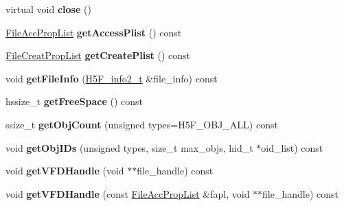 \begin{DoxyCompactItemize}
\item 
\mbox{\label{class_h5_1_1_h5_file_a937dc0b3dd01709ea65b6ff816f96757}} 
virtual void {\bfseries close} ()
\item 
\mbox{\label{class_h5_1_1_h5_file_a99f69dbd676df2186493a3090a5275db}} 
\hyperlink{class_h5_1_1_file_acc_prop_list}{File\+Acc\+Prop\+List} {\bfseries get\+Access\+Plist} () const
\item 
\mbox{\label{class_h5_1_1_h5_file_a8270a0bd23800aa05d3d12951ee40e64}} 
\hyperlink{class_h5_1_1_file_creat_prop_list}{File\+Creat\+Prop\+List} {\bfseries get\+Create\+Plist} () const
\item 
\mbox{\label{class_h5_1_1_h5_file_a7d1aa654f620e47e0283cd087f850594}} 
void {\bfseries get\+File\+Info} (\hyperlink{struct_h5_f__info2__t}{H5\+F\+\_\+info2\+\_\+t} \&file\+\_\+info) const
\item 
\mbox{\label{class_h5_1_1_h5_file_a76ae0346b2dc80b8317cd2a40d47f552}} 
hssize\+\_\+t {\bfseries get\+Free\+Space} () const
\item 
\mbox{\label{class_h5_1_1_h5_file_ab318fe48af16bf1f15d4ef81bcb5dfac}} 
ssize\+\_\+t {\bfseries get\+Obj\+Count} (unsigned types=H5\+F\+\_\+\+O\+B\+J\+\_\+\+A\+LL) const
\item 
\mbox{\label{class_h5_1_1_h5_file_a062247a9f98d83036113b0117531e537}} 
void {\bfseries get\+Obj\+I\+Ds} (unsigned types, size\+\_\+t max\+\_\+objs, hid\+\_\+t $\ast$oid\+\_\+list) const
\item 
\mbox{\label{class_h5_1_1_h5_file_a99945ff273f5d8298dc673f46edf4dcd}} 
void {\bfseries get\+V\+F\+D\+Handle} (void $\ast$$\ast$file\+\_\+handle) const
\item 
\mbox{\label{class_h5_1_1_h5_file_a4480c9a251b5a6a19bccbc4f58e5ee65}} 
void {\bfseries get\+V\+F\+D\+Handle} (const \hyperlink{class_h5_1_1_file_acc_prop_list}{File\+Acc\+Prop\+List} \&fapl, void $\ast$$\ast$file\+\_\+handle) const
\item 
\mbox{\label{class_h5_1_1_h5_file_a9f85949a9bcf97244244b272f1209d4f}} 

\end{DoxyCompactItemize}
